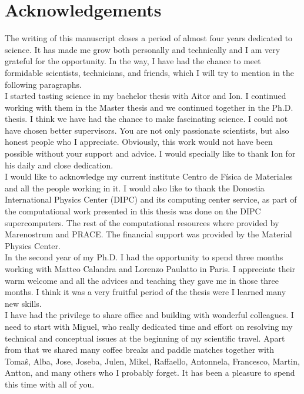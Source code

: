 
\chapter*{Acknowledgements} %

The writing of this manuscript closes a period of almost four years dedicated to science. It has made me grow both 
personally and technically and I am very grateful for the opportunity. In the way, I have had the chance to meet 
formidable scientists, technicians, and friends, which I will try to mention in the following paragraphs. \\

I started tasting science in my bachelor thesis with Aitor and Ion. I continued working with them in the Master 
thesis and we continued together in the Ph.D. thesis. I think we have had the chance to make fascinating science. I 
could not have chosen better supervisors. You are not only passionate scientists, but also honest people who I 
appreciate. Obviously, this work would not have been possible without your support and advice. I would specially like 
to thank Ion for his daily and close dedication. \\

I would like to acknowledge my current institute Centro de F\'isica de Materiales and all the people working in it. I 
would also like to thank the Donostia International Physics Center (DIPC) and its computing center service, as part 
of the computational work presented in this thesis was done on the DIPC supercomputers. The rest of the computational
resources where provided by Marenostrum and PRACE. The financial support was provided by the Material Physics 
Center. \\

In the second year of my Ph.D. I had the opportunity to spend three months working with Matteo Calandra and Lorenzo 
Paulatto in Paris. I appreciate their warm welcome and all the advices and teaching they gave me in those three 
months. I think it was a very fruitful period of the thesis were I learned many new skills. \\

I have had the privilege to share office and building with wonderful colleagues. I need to start with Miguel, who 
really dedicated time and effort on resolving my technical and conceptual issues at the beginning of my scientific 
travel. Apart from that we shared many coffee breaks and paddle matches together with Toma\^s, Alba, Jose, Joseba, 
Julen, Mikel, Raffaello, Antonnela, Francesco, Martin, Antton, and many others who I probably forget. It has been a 
pleasure to spend this time with all of you. \\

